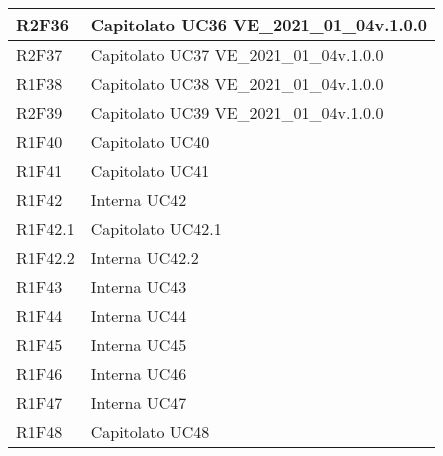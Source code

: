 \begin{center}
\begin{longtable}{|p{22mm}|p{44mm}|}
R2F36 &
Capitolato \newline
UC36 \newline
VE\_2021\_01\_04v.1.0.0 
\\
\hline

R2F37 &
Capitolato \newline
UC37 \newline
VE\_2021\_01\_04v.1.0.0 
\\
\hline

R1F38 &
Capitolato \newline
UC38 \newline
VE\_2021\_01\_04v.1.0.0 
\\
\hline

R2F39 &
Capitolato \newline
UC39 \newline
VE\_2021\_01\_04v.1.0.0 
\\
\hline

 
R1F40 &
Capitolato \newline
UC40 
\\
\hline

R1F41 &
Capitolato \newline
UC41 
\\
\hline

R1F42 &
Interna \newline
UC42 
\\
\hline

R1F42.1 &
Capitolato \newline
UC42.1 
\\
\hline

R1F42.2 &
Interna \newline
UC42.2 
\\
\hline

R1F43 &
Interna \newline
UC43 
\\
\hline

R1F44 &
Interna \newline
UC44 
\\
\hline

R1F45 &
Interna \newline
UC45 
\\
\hline

R1F46 &
Interna \newline
UC46 
\\
\hline

R1F47 &
Interna \newline
UC47 
\\
\hline

R1F48 &
Capitolato \newline
UC48 
\\
\hline


\end{longtable}
\end{center}
